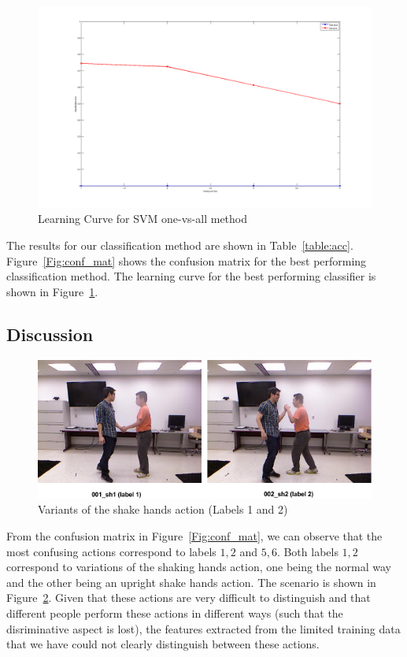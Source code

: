 \documentclass[10pt,twocolumn,letterpaper]{article}
\begin{document}
\begin{figure}[ht]
\includegraphics[scale=0.1]{svm_ovr_lc.png}
\caption{Learning Curve for SVM one-vs-all method}

\label{Fig:lc}
\end{figure}

The results for our classification method are shown in Table~\ref{table:acc}. Figure~\ref{Fig:conf_mat} shows the confusion matrix for the best performing classification method. The learning curve for the best performing classifier is shown in Figure~\ref{Fig:lc}.

\subsection*{Discussion}

\begin{figure}[ht]
\centering
\includegraphics[scale=0.3]{sh_conf.png}
\caption{Variants of the shake hands action (Labels 1 and 2)}
\label{Fig:sh_conf}
\end{figure}
From the confusion matrix in Figure~\ref{Fig:conf_mat}, we can observe that the most confusing actions correspond to labels ${1,2}$ and ${5,6}$. Both labels ${1,2}$ correspond  to variations of the shaking hands action, one being the normal way and the other being an upright shake hands action. The scenario is shown in Figure~\ref{Fig:sh_conf}. Given that these actions are very difficult to distinguish and that different people perform these actions in different ways (such that the disriminative aspect is lost), the features extracted from the limited training data that we have could not clearly distinguish between these actions. 
\end{document}
